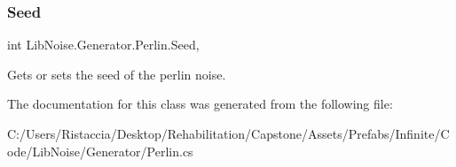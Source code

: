 \subsubsection{\texorpdfstring{Seed}{Seed}}
{\footnotesize\ttfamily int Lib\+Noise.\+Generator.\+Perlin.\+Seed\hspace{0.3cm}{\ttfamily [get]}, {\ttfamily [set]}}



Gets or sets the seed of the perlin noise. 



The documentation for this class was generated from the following file\+:\begin{DoxyCompactItemize}
\item 
C\+:/\+Users/\+Ristaccia/\+Desktop/\+Rehabilitation/\+Capstone/\+Assets/\+Prefabs/\+Infinite/\+Code/\+Lib\+Noise/\+Generator/Perlin.\+cs\end{DoxyCompactItemize}
